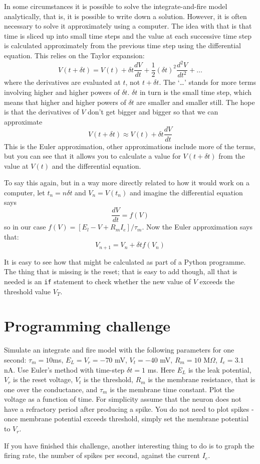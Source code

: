 \documentclass[12pt]{article}
\begin{document}
In some circumstances it is possible to solve the integrate-and-fire
model analytically, that is, it is possible to write down a
solution. However, it is often necessary to solve it approximately
using a computer. The idea with that is that time is sliced up into
small time steps and the value at each successive time step is
calculated approximately from the previous time step using the
differential equation. This relies on the Taylor expansion:
\begin{equation}
V(t+\delta t)=V(t)+\delta t \frac{dV}{dt}+\frac{1}{2}(\delta t)^2\frac{d^2V}{dt^2}+\ldots
\end{equation}
where the derivatives are evaluated at $t$, not $t+\delta t$. The
\lq{}\ldots\rq{} stands for more terms involving higher and higher
powers of $\delta t$. $\delta t$ in turn is the small time step, which
means that higher and higher powers of $\delta t$ are smaller and
smaller still. The hope is that the derivatives of $V$ don't get bigger and bigger so that we can approximate
\begin{equation}
V(t+\delta t)\approx V(t)+\delta t \frac{dV}{dt}
\end{equation}
This is the Euler approximation, other approximations include more of
the terms, but you can see that it allows you to calculate a value for
$V(t+\delta t)$ from the value at $V(t)$ and the differential equation.

To say this again, but in a way more directly related to how it would
work on a computer, let $t_n=n\delta t$ and $V_n=V(t_n)$ and imagine the differential equation says
\begin{equation}
\frac{dV}{dt}=f(V)
\end{equation}
so in our case $f(V)=[E_l-V+R_mI_e]/\tau_m$. Now the
Euler approximation says that:
\begin{equation}
V_{n+1}=V_n+\delta t f(V_n)
\end{equation}

It is easy to see how that might be calculated as part of a Python
programme. The thing that is missing is the reset; that is easy to add
though, all that is needed is an \texttt{if} statement to check
whether the new value of $V$ exceeds the threshold value $V_T$.

\section*{Programming challenge}

Simulate an integrate and fire model with the following parameters for
one second: $\tau_m = 10 $ms, $E_L = V_r = -70$ mV, $V_t = -40$ mV,
$R_m= 10$ M$\Omega$, $I_e = 3.1 $ nA. Use Euler's method with time-step
$\delta t = 1$ ms. Here $E_L$ is the leak potential, $V_r$ is the
reset voltage, $V_t$ is the threshold, $R_m$ is the membrane
resistance, that is one over the conductance, and $\tau_m$ is the
membrane time constant. Plot the voltage as a function of time. For
simplicity assume that the neuron does not have a refractory period
after producing a spike. You do not need to plot spikes - once
membrane potential exceeds threshold, simply set the membrane
potential to $V_r$.

If you have finished this challenge, another interesting thing to do
is to graph the firing rate, the number of spikes per second, against
the current $I_e$.
\end{document}
